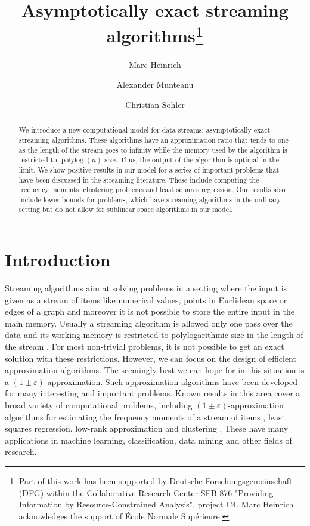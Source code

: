 \documentclass[a4paper,11pt,oneside,english,onecolumn]{article}
\title{Asymptotically exact streaming algorithms\thanks{Part of this work has been supported by Deutsche Forschungsgemeinschaft (DFG) within the Collaborative Research Center SFB 876 "Providing Information by Resource-Constrained Analysis",
project C4. Marc Heinrich acknowledges the support of \'Ecole Normale Sup\'erieure.}}
\author[1]{Marc Heinrich}
\affil[1]{D\'epartement d'Informatique,\authorcr
\'Ecole Normale Sup\'erieure, Paris, France\authorcr
		  \texttt{marc.heinrich@ens.fr}
}
\author[2]{Alexander Munteanu}
\author[2]{Christian Sohler}
\affil[2]{Department of Computer Science, TU Dortmund, Germany\authorcr
		  \texttt{\{alexander.munteanu,christian.sohler\}@tu-dortmund.de}
}
\theoremstyle{definition}
\newcommand{\eps}{\ensuremath{\varepsilon}}
\begin{document}
\maketitle
\thispagestyle{empty}
\begin{abstract}
\noindent
We introduce a new computational model for data streams: asymptotically exact streaming algorithms. These algorithms have an approximation ratio that tends to one as the length of the stream goes to infinity while the memory used by the algorithm is restricted to $\operatorname{polylog}(n)$ size. Thus, the output of the algorithm is optimal in the limit. We show positive results in our model for a series of important problems that have been discussed in the streaming literature. These include computing the frequency moments, clustering problems and least squares regression. Our results also include lower bounds for problems, which have streaming algorithms in the ordinary setting but do not allow for sublinear space algorithms in our model.\\

\noindent
\end{abstract}

\section{Introduction}
Streaming algorithms aim at solving problems in a setting where the input is given as a stream of items like numerical values, points in Euclidean space or edges of a graph and moreover it is not possible to store the entire input in the main memory. Usually a streaming algorithm is allowed only one pass over the data and its working memory is restricted to polylogarithmic size in the length of the stream \cite{Muthukrishnan05}. For most non-trivial problems, it is not possible to get an exact solution with these restrictions. However, we can focus on the design of efficient approximation algorithms. The seemingly best we can hope for in this situation is a $(1\pm\eps)$-approximation. Such approximation algorithms have been developed for many interesting and important problems. Known results in this area cover a broad variety of computational problems, including $(1\pm\eps)$-approximation algorithms for estimating the frequency moments of a stream of items \cite{ApproxFreqMom}, least squares regression, low-rank approximation \cite{LinAlgStream} and clustering \cite{ClusteringMotion}. These have many applications in machine learning, classification, data mining and other fields of research.
\end{document}

